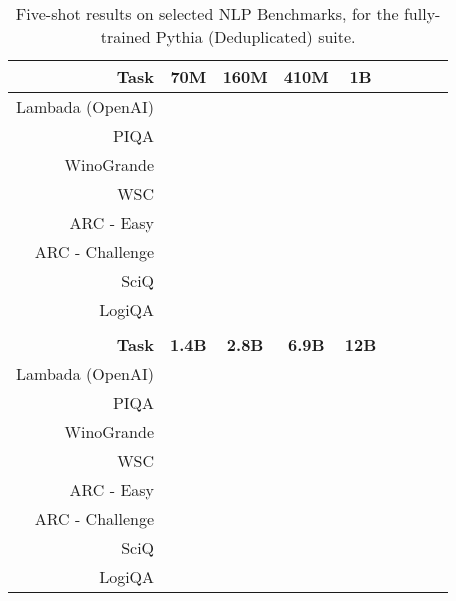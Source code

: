 \documentclass{article}
\theoremstyle{plain}
\theoremstyle{definition}
\theoremstyle{remark}
\begin{document}
\begin{table}[H]
\centering
\begin{tabular}{rcccccccc}
\toprule
\textbf{Task} & \textbf{70M} & \textbf{160M} & \textbf{410M} & \textbf{1B} \\
\midrule
Lambada (OpenAI) &  &  &  &  \\
PIQA &  &  &  &  \\
WinoGrande &  &  &  &  \\
WSC &  &  &  &  \\
ARC - Easy &  &  &  &  \\
ARC - Challenge &  &  &  &  \\
SciQ &  &  &  &  \\
LogiQA &  &  &  &  \\
\bottomrule
\\
\textbf{Task} & \textbf{1.4B} & \textbf{2.8B} & \textbf{6.9B} & \textbf{12B} \\
\midrule
Lambada (OpenAI)&  &  &  &  \\
PIQA &  &  &  &  \\
WinoGrande &  &  &  &  \\
WSC &  &  &  &  \\
ARC - Easy &  &  &  &  \\
ARC - Challenge &  &  &  &  \\
SciQ &  &  &  &  \\
LogiQA &  &  &  &  \\
\bottomrule
\end{tabular}
\caption{Five-shot results on selected NLP Benchmarks, for the fully-trained Pythia (Deduplicated) suite.}
\end{table}
\end{document}
